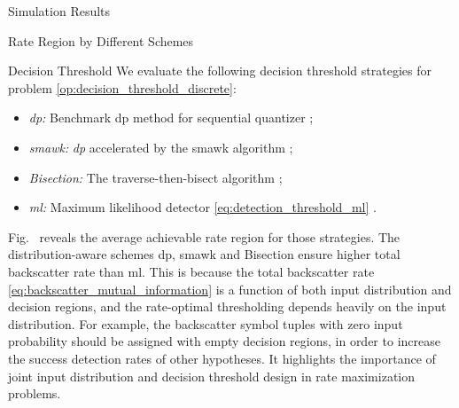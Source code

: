 \documentclass[journal]{IEEEtran}
\begin{document}
\begin{section}{Simulation Results}
\begin{subsection}{Rate Region by Different Schemes}
		\begin{subsubsection}{Decision Threshold}
			We evaluate the following decision threshold strategies for problem \eqref{op:decision_threshold_discrete}:
			\begin{itemize}
				\item \emph{\gls{dp}:} Benchmark \gls{dp} method for sequential quantizer \cite{He2021};
				\item \emph{\gls{smawk}:} \emph{\gls{dp}} accelerated by the \gls{smawk} algorithm \cite{He2021};
				\item \emph{Bisection:} The traverse-then-bisect algorithm \cite{Nguyen2020a};
				\item \emph{\gls{ml}:} Maximum likelihood detector \eqref{eq:detection_threshold_ml} \cite{Qian2019}.
			\end{itemize}

			Fig.~ reveals the average achievable rate region for those strategies.
			The distribution-aware schemes \gls{dp}, \gls{smawk} and Bisection ensure higher total backscatter rate than \gls{ml}.
			This is because the total backscatter rate \eqref{eq:backscatter_mutual_information} is a function of both input distribution and decision regions, and the rate-optimal thresholding depends heavily on the input distribution.
			For example, the backscatter symbol tuples with zero input probability should be assigned with empty decision regions, in order to increase the success detection rates of other hypotheses.
			It highlights the importance of joint input distribution and decision threshold design in rate maximization problems.
		\end{subsubsection}

	\end{subsection}



\end{section}
\end{document}
